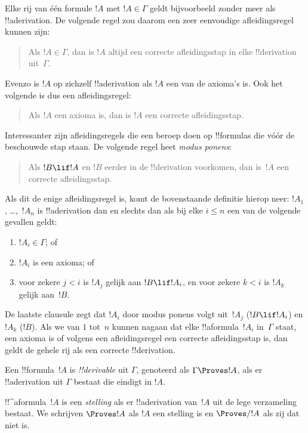 \documentclass[../../../include/open-logic-section]{subfiles}
\begin{document}
Elke rij van één formule $!A$ met $!A \in \Gamma$ geldt bijvoorbeeld
zonder meer als !!a{derivation}. De volgende regel zou daarom een zeer
eenvoudige afleidingsregel kunnen zijn:
\begin{quote}
  Als $!A \in \Gamma$, dan is $!A$ altijd een correcte afleidingsstap
  in elke !!{derivation} uit~$\Gamma$.
\end{quote}
Evenzo is $!A$ op zichzelf !!a{derivation} als $!A$ een van de
axioma's is. Ook het volgende is dus een afleidingsregel:
\begin{quote}
  Als $!A$ een axioma is, dan is $!A$ een correcte afleidingsstap.
\end{quote}
Interessanter zijn afleidingsregels die een beroep doen op
!!{formula}s die vóór de beschouwde stap staan. De volgende regel heet
\emph{modus ponens}:
\begin{quote}
  Als $!B \lif !A$ en $!B$ eerder in de !!{derivation} voorkomen,
  dan is~$!A$ een correcte afleidingsstap.
\end{quote}
Als dit de enige afleidingsregel is, komt de bovenstaande definitie
hierop neer: $!A_1$, \dots,~$!A_n$ is !!a{derivation} dan en slechts
dan als bij elke $i \le n$ een van de volgende gevallen geldt:
\begin{enumerate}
\item $!A_i \in \Gamma$; of
\item $!A_i$ is een axioma; of
\item voor zekere $j < i$ is $!A_j$ gelijk aan $!B \lif !A_i$, en voor
  zekere $k < i$ is $!A_k$ gelijk aan~$!B$.
\end{enumerate}
De laatste clausule zegt dat $!A_i$ door modus ponens volgt
uit~$!A_j$ ($!B \lif !A_i$) en $!A_k$ ($!B$). Als we van $1$ tot~$n$
kunnen nagaan dat elke !!a{formula}~$!A_i$ in~$\Gamma$ staat, een
axioma is of volgens een afleidingsregel een correcte afleidingsstap
is, dan geldt de gehele rij als een correcte !!{derivation}.

\begin{defn}[!!^{derivability}]
Een !!{formula}~$!A$ is \emph{!!{derivable}} uit $\Gamma$, genoteerd
als $\Gamma \Proves !A$, als er !!a{derivation} uit $\Gamma$ bestaat
die eindigt in $!A$.
\end{defn}

\begin{defn}[Stellingen]
!!^a{formula}~$!A$ is een \emph{stelling} als er !!a{derivation}
van~$!A$ uit de lege verzameling bestaat. We schrijven $\Proves !A$
als $!A$ een stelling is en $\Proves/ !A$ als zij dat niet is.
\end{defn}
\end{document}
